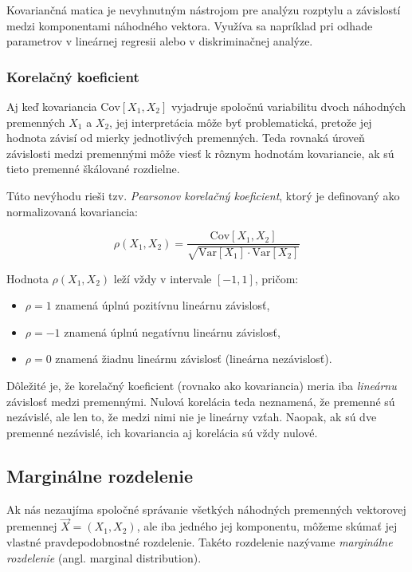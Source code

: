 Kovariančná matica je nevyhnutným nástrojom pre analýzu rozptylu a závislostí medzi komponentami náhodného vektora. Využíva sa napríklad pri odhade parametrov v lineárnej regresii alebo v diskriminačnej analýze.

\subsubsection{Korelačný koeficient}\label{subsubsec:correlation}

Aj keď kovariancia $\mathrm{Cov}[X_1, X_2]$ vyjadruje spoločnú variabilitu dvoch náhodných premenných $X_1$ a $X_2$, jej interpretácia môže byť problematická, pretože jej hodnota závisí od mierky jednotlivých premenných. Teda rovnaká úroveň závislosti medzi premennými môže viesť k rôznym hodnotám kovariancie, ak sú tieto premenné škálované rozdielne.

Túto nevýhodu rieši tzv. \textit{Pearsonov korelačný koeficient}, ktorý je definovaný ako normalizovaná kovariancia:

\begin{equation}
\rho(X_1, X_2) = \frac{\mathrm{Cov}[X_1, X_2]}{\sqrt{\mathrm{Var}[X_1] \cdot \mathrm{Var}[X_2]}}
\end{equation}

Hodnota $\rho(X_1, X_2)$ leží vždy v intervale $[-1, 1]$, pričom:

\begin{itemize}
  \item $\rho = 1$ znamená úplnú pozitívnu lineárnu závislosť,
  \item $\rho = -1$ znamená úplnú negatívnu lineárnu závislosť,
  \item $\rho = 0$ znamená žiadnu lineárnu závislosť (lineárna nezávislosť).
\end{itemize}

Dôležité je, že korelačný koeficient (rovnako ako kovariancia) meria iba \textit{lineárnu} závislosť medzi premennými. Nulová korelácia teda neznamená, že premenné sú nezávislé, ale len to, že medzi nimi nie je lineárny vzťah. Naopak, ak sú dve premenné nezávislé, ich kovariancia aj korelácia sú vždy nulové.

\subsection{Marginálne rozdelenie}\label{subsec:marginal_dist}

Ak nás nezaujíma spoločné správanie všetkých náhodných premenných vektorovej premennej $\vec{X} = (X_1, X_2)$, ale iba jedného jej komponentu, môžeme skúmať jej vlastné pravdepodobnostné rozdelenie. Takéto rozdelenie nazývame \textit{marginálne rozdelenie} (angl. marginal distribution).

